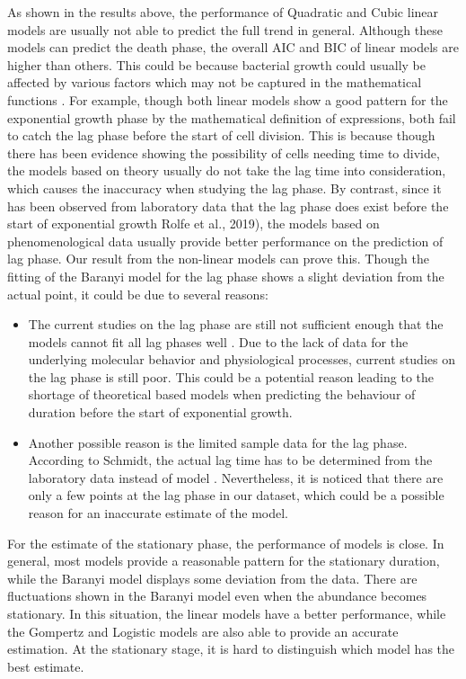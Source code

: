 \documentclass[11pt, oneside]{article}
\begin{document}
	As shown in the results above, the performance of Quadratic and Cubic linear models are usually not able to predict the full trend in general. Although these models can predict the death phase, the overall AIC and BIC of linear models are higher than others. This could be because bacterial growth could usually be affected by various factors which may not be captured in the mathematical functions \cite{Sutherland and Norris}. For example, though both linear models show a good pattern for the exponential growth phase by the mathematical definition of expressions, both fail to catch the lag phase before the start of cell division. This is because though there has been evidence showing the possibility of cells needing time to divide, the models based on theory usually do not take the lag time into consideration, which causes the inaccuracy when studying the lag phase. By contrast, since it has been observed from laboratory data that the lag phase does exist before the start of exponential growth \cite{Rolfe et al.}Rolfe et al., 2019), the models based on phenomenological data usually provide better performance on the prediction of lag phase. Our result from the non-linear models can prove this. Though the fitting of the Baranyi model for the lag phase shows a slight deviation from the actual point, it could be due to several reasons:
	\begin{itemize}
	\item The current studies on the lag phase are still not sufficient enough that the models cannot fit all lag phases well \cite{Rolfe et al.}. Due to the lack of data for the underlying molecular behavior and physiological processes, current studies on the lag phase is still poor. This could be a potential reason leading to the shortage of theoretical based models when predicting the behaviour of duration before the start of exponential growth.
	\item Another possible reason is the limited sample data for the lag phase. According to Schmidt, the actual lag time has to be determined from the laboratory data instead of model \cite{Yilmaz}. Nevertheless, it is noticed that there are only a few points at the lag phase in our dataset, which could be a possible reason for an inaccurate estimate of the model.
	\end{itemize}
	\noindent For the estimate of the stationary phase, the performance of models is close. In general, most models provide a reasonable pattern for the stationary duration, while the Baranyi model displays some deviation from the data. There are fluctuations shown in the Baranyi model even when the abundance becomes stationary. In this situation, the linear models have a better performance, while the Gompertz and Logistic models are also able to provide an accurate estimation. At the stationary stage, it is hard to distinguish which model has the best estimate.
\end{document}
